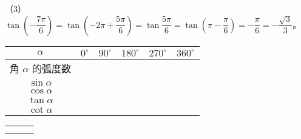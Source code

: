 （3）$\tan \left(-\dfrac{7\pi}{6} \right) = \tan \left(-2\pi + \dfrac{5\pi}{6} \right) = \tan \dfrac{5\pi}{6} = \tan \left(\pi - \dfrac{\pi}{6} \right) = - \dfrac{\pi}{6} = -\dfrac{\sqrt{3}}{3}$。
\vspace{0.5em}

\lianxi
\begin{xiaotis}



\begin{table}[H]
\renewcommand\arraystretch{1.5}
\hspace{4em}
\begin{tabular}{|c|*{5}{w{c}{4em}|}}
    \hline
    $\alpha$ & $0^\circ$ & $90^\circ$ & $180^\circ$ & $270^\circ$ & $360^\circ$ \\ \hline
    角 $\alpha$ 的弧度数 &  \\ \hline
    $\sin \alpha$ &  \\ \hline
    $\cos \alpha$ &  \\ \hline
    $\tan \alpha$ &  \\ \hline
    $\cot \alpha$ &  \\ \hline
\end{tabular}
\end{table}
    

\begin{xiaoxiaotis}

    \renewcommand\arraystretch{1.5}
    \begin{tabular}[t]{*{3}{@{}p{9em}}}
         &  &  \\
         &  & 
    \end{tabular}
    \vspace{0.5em}
    
\end{xiaoxiaotis}

\begin{xiaoxiaotis}


\end{xiaoxiaotis}
\end{xiaotis}
